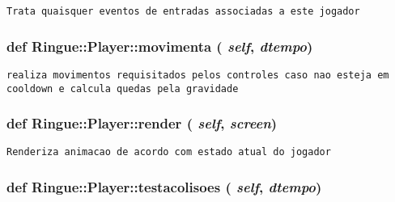 \begin{footnotesize}\begin{verbatim}Trata quaisquer eventos de entradas associadas a este jogador \end{verbatim}
\end{footnotesize}
 \hypertarget{class_ringue_1_1_player_b7a5bb4b3b2c1d56065fee5c585e7f77}{
\subsubsection[{movimenta}]{\setlength{\rightskip}{0pt plus 5cm}def Ringue::Player::movimenta ( {\em self}, \/   {\em dtempo})}}
\label{class_ringue_1_1_player_b7a5bb4b3b2c1d56065fee5c585e7f77}




\begin{footnotesize}\begin{verbatim}realiza movimentos requisitados pelos controles caso nao esteja em cooldown e calcula quedas pela gravidade \end{verbatim}
\end{footnotesize}
 \hypertarget{class_ringue_1_1_player_a3e631f4c903e4a318585caa600a7515}{
\subsubsection[{render}]{\setlength{\rightskip}{0pt plus 5cm}def Ringue::Player::render ( {\em self}, \/   {\em screen})}}
\label{class_ringue_1_1_player_a3e631f4c903e4a318585caa600a7515}




\begin{footnotesize}\begin{verbatim}Renderiza animacao de acordo com estado atual do jogador \end{verbatim}
\end{footnotesize}
 \hypertarget{class_ringue_1_1_player_2d879892de2f1e020610deb1ad309ca3}{
\subsubsection[{testacolisoes}]{\setlength{\rightskip}{0pt plus 5cm}def Ringue::Player::testacolisoes ( {\em self}, \/   {\em dtempo})}}
\label{class_ringue_1_1_player_2d879892de2f1e020610deb1ad309ca3}





